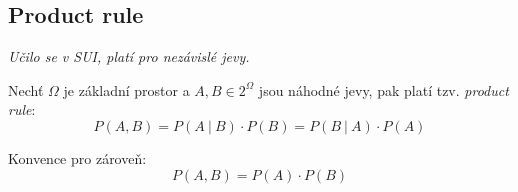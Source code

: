\subsection{Product rule}

\begin{compactitem}
    \item \textit{Učilo se v SUI, platí pro nezávislé jevy.}

    \item Nechť $\Omega$ je základní prostor a $A, B \in 2^{\Omega}$ jsou náhodné jevy, pak platí tzv. \textit{product rule}:
    $$ P(A, B) = P(A ~|~ B) \cdot P(B) = P(B ~|~ A) \cdot P(A) $$

    \item Konvence pro zároveň:
    $$ P(A, B) = P(A) \cdot P(B) $$
\end{compactitem}
